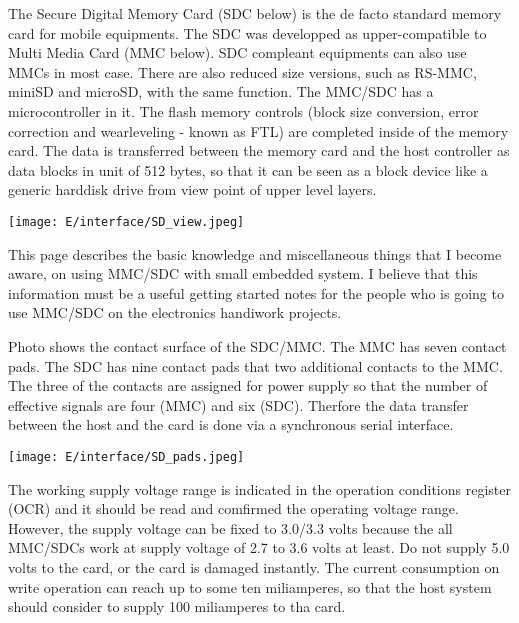 \secdown\label{ESD}


The Secure Digital Memory Card (SDC below) is the de facto standard memory card
for mobile equipments. The SDC was developped as upper-compatible to Multi Media
Card (MMC below). SDC compleant equipments can also use MMCs in most case. There
are also reduced size versions, such as RS-MMC, miniSD and microSD, with the
same function. The MMC/SDC has a microcontroller in it. The flash memory
controls (block size conversion, error correction and wearleveling - known as
FTL) are completed inside of the memory card. The data is transferred between
the memory card and the host controller as data blocks in unit of 512 bytes, so
that it can be seen as a block device like a generic harddisk drive from view
point of upper level layers.

\bigskip
\texttt{[image: E/interface/SD\_view.jpeg]}
\bigskip

This page describes the basic knowledge and miscellaneous things that I become
aware, on using MMC/SDC with small embedded system. I believe that this
information must be a useful getting started notes for the people who is going
to use MMC/SDC on the electronics handiwork projects.


Photo shows the contact surface of the SDC/MMC. The MMC has seven contact
pads. The SDC has nine contact pads that two additional contacts to the MMC. The
three of the contacts are assigned for power supply so that the number of
effective signals are four (MMC) and six (SDC). Therfore the data transfer
between the host and the card is done via a synchronous serial interface.

\bigskip
\texttt{[image: E/interface/SD\_pads.jpeg]}
\bigskip

The working supply voltage range is indicated in the operation conditions
register (OCR) and it should be read and comfirmed the operating voltage range.
However, the supply voltage can be fixed to 3.0/3.3 volts because the all
MMC/SDCs work at supply voltage of 2.7 to 3.6 volts at least. Do not supply 5.0
volts to the card, or the card is damaged instantly. The current consumption on
write operation can reach up to some ten miliamperes, so that the host system
should consider to supply 100 miliamperes to tha card.

